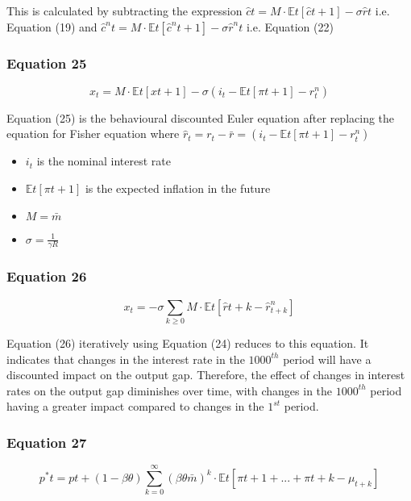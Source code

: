 \documentclass{article}
\begin{document}
This is calculated by subtracting the expression $\hat{c}{t}=M\cdot\mathbb{E}{t}\left[\hat{c}{t+1}\right]-\sigma\hat{r}{t}$ i.e. Equation (19) and $\hat{c}^{n}{t} = M\cdot\mathbb{E}{t}\left[\hat{c}^{n}{t+1}\right]-\sigma\hat{r}^{n}{t}$ i.e. Equation (22)

\subsubsection*{Equation 25}
\begin{equation}
    x_{t}=M\cdot\mathbb{E}{t}\left[x{t+1}\right]-\sigma(i_{t}-\mathbb{E}{t}\left[\pi{t+1}\right]-r^{n}_{t})
\end{equation}

Equation (25) is the behavioural discounted Euler equation after replacing the equation for Fisher equation  where $\hat r_{t}= r_{t}- \bar r = (i_{t}-\mathbb{E}{t}\left[\pi{t+1}\right]-r^{n}_{t})$
\begin{itemize}
    \item $i_{t}$ is the nominal interest rate
    \item $\mathbb{E}{t}\left[\pi{t+1}\right]$ is the expected inflation in the future
    \item $M=\bar{m}$
    \item $\sigma=\frac{1}{\gamma R}$
\end{itemize}

\subsubsection*{Equation 26}
\begin{equation}
    x_{t}=-\sigma\sum_{k\geq 0}{M\cdot \mathbb{E}{t}\left[\hat{r}{t+k}-\hat{r}_{t+k}^{n}\right]}
\end{equation}

Equation (26) iteratively using Equation (24) reduces to this equation. It indicates that changes in the interest rate in the $1000^{th}$ period will have a discounted impact on the output gap. Therefore, the effect of changes in interest rates on the output gap diminishes over time, with changes in the $1000^{th}$ period having a greater impact compared to changes in the $1^{st}$ period.


 \subsubsection*{Equation 27}
\begin{equation}
    p^{*}{t}=p{t}+(1-\beta\theta)\sum_{k=0}^{\infty}\left(\beta\theta\bar{m}\right)^{k}\cdot\mathbb{E}{t}\left[\pi{t+1}+...+\pi{t+k}-\mu_{t+k}\right]
\end{equation}
\end{document}
